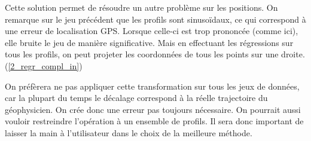 \documentclass[12pt]{article}
\begin{document}
    \label{2_regr_compl_out}Cette solution permet de résoudre un autre problème sur les positions. On remarque sur le jeu précédent que les profils sont sinusoïdaux, ce qui correspond à une erreur de localisation GPS. Lorsque celle-ci est trop prononcée (comme ici), elle bruite le jeu de manière significative. Mais en effectuant les régressions sur tous les profils, on peut projeter les coordonnées de tous les points sur une droite. (\ref{2_regr_compl_in})

    On préfèrera ne pas appliquer cette transformation sur tous les jeux de données, car la plupart du temps le décalage correspond à la réelle trajectoire du géophysicien. On crée donc une erreur pas toujours nécessaire. On pourrait aussi vouloir restreindre l'opération à un ensemble de profils. Il sera donc important de laisser la main à l'utilisateur dans le choix de la meilleure méthode.
\end{document}
